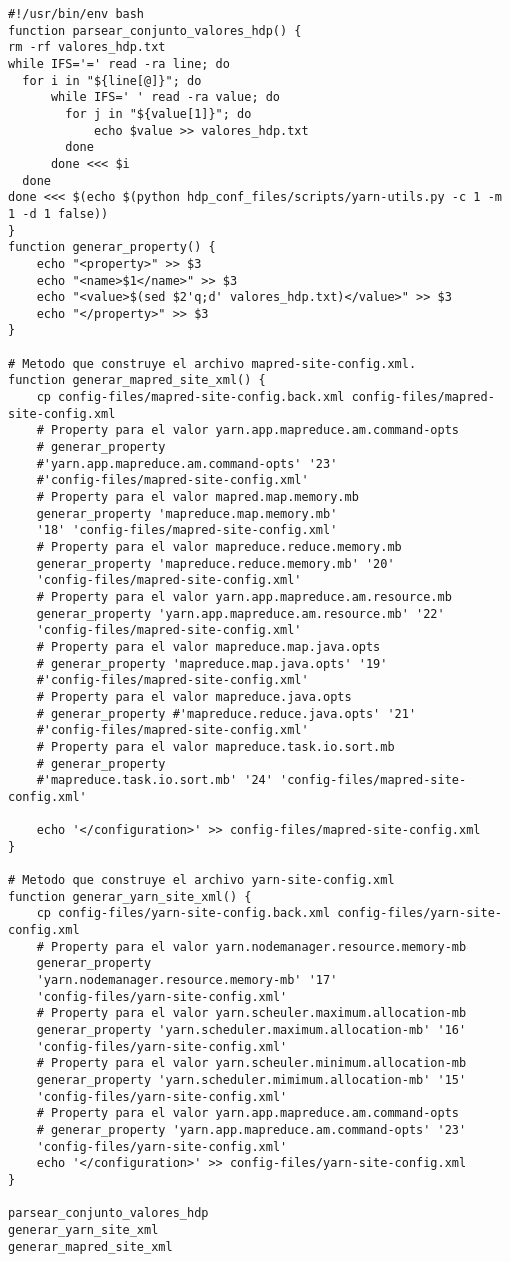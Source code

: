 \begin{lstlisting}
#!/usr/bin/env bash
function parsear_conjunto_valores_hdp() {
rm -rf valores_hdp.txt
while IFS='=' read -ra line; do
  for i in "${line[@]}"; do
      while IFS=' ' read -ra value; do
      	for j in "${value[1]}"; do
      		echo $value >> valores_hdp.txt
      	done
      done <<< $i
  done
done <<< $(echo $(python hdp_conf_files/scripts/yarn-utils.py -c 1 -m 1 -d 1 false))
}
function generar_property() {
	echo "<property>" >> $3
	echo "<name>$1</name>" >> $3
	echo "<value>$(sed $2'q;d' valores_hdp.txt)</value>" >> $3
	echo "</property>" >> $3
}

# Metodo que construye el archivo mapred-site-config.xml.
function generar_mapred_site_xml() {
	cp config-files/mapred-site-config.back.xml config-files/mapred-site-config.xml
	# Property para el valor yarn.app.mapreduce.am.command-opts
	# generar_property 
	#'yarn.app.mapreduce.am.command-opts' '23' 
	#'config-files/mapred-site-config.xml'
	# Property para el valor mapred.map.memory.mb
	generar_property 'mapreduce.map.memory.mb' 
	'18' 'config-files/mapred-site-config.xml'
	# Property para el valor mapreduce.reduce.memory.mb
	generar_property 'mapreduce.reduce.memory.mb' '20' 
	'config-files/mapred-site-config.xml'
	# Property para el valor yarn.app.mapreduce.am.resource.mb
	generar_property 'yarn.app.mapreduce.am.resource.mb' '22' 
	'config-files/mapred-site-config.xml'
	# Property para el valor mapreduce.map.java.opts
	# generar_property 'mapreduce.map.java.opts' '19' 
	#'config-files/mapred-site-config.xml'
	# Property para el valor mapreduce.java.opts
	# generar_property #'mapreduce.reduce.java.opts' '21' 
	#'config-files/mapred-site-config.xml'
	# Property para el valor mapreduce.task.io.sort.mb
	# generar_property 
	#'mapreduce.task.io.sort.mb' '24' 'config-files/mapred-site-config.xml'

	echo '</configuration>' >> config-files/mapred-site-config.xml 
}

# Metodo que construye el archivo yarn-site-config.xml
function generar_yarn_site_xml() {
	cp config-files/yarn-site-config.back.xml config-files/yarn-site-config.xml
	# Property para el valor yarn.nodemanager.resource.memory-mb
	generar_property
	'yarn.nodemanager.resource.memory-mb' '17' 
	'config-files/yarn-site-config.xml'
	# Property para el valor yarn.scheuler.maximum.allocation-mb
	generar_property 'yarn.scheduler.maximum.allocation-mb' '16' 
	'config-files/yarn-site-config.xml'
	# Property para el valor yarn.scheuler.minimum.allocation-mb
	generar_property 'yarn.scheduler.mimimum.allocation-mb' '15' 
	'config-files/yarn-site-config.xml'
	# Property para el valor yarn.app.mapreduce.am.command-opts
	# generar_property 'yarn.app.mapreduce.am.command-opts' '23' 
	'config-files/yarn-site-config.xml'
	echo '</configuration>' >> config-files/yarn-site-config.xml
}

parsear_conjunto_valores_hdp
generar_yarn_site_xml
generar_mapred_site_xml
\end{lstlisting}